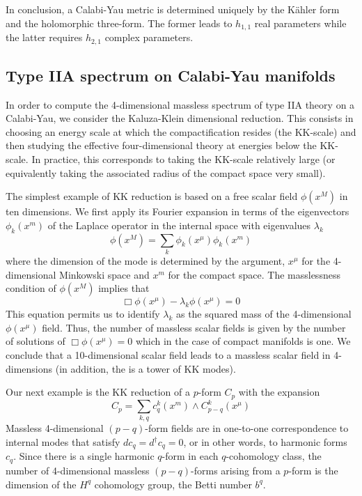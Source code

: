 In conclusion, a Calabi-Yau metric is determined uniquely by the Kähler form and the holomorphic three-form.
The former leads to $h_{1,1}$ real parameters while the latter requires $h_{2,1}$ complex parameters.


\subsection{Type IIA spectrum on Calabi-Yau manifolds}
In order to compute the 4-dimensional massless spectrum of type IIA theory on a Calabi-Yau, we consider the 
Kaluza-Klein dimensional reduction.
This consists in choosing an energy scale at which the compactification resides (the KK-scale)
and then studying the effective four-dimensional theory at energies below the KK-scale.
In practice, this corresponds to taking the KK-scale relatively large (or equivalently taking the associated radius of the compact space very small). 

The simplest example of KK reduction is based on a free scalar field $\phi(x^M)$ in ten dimensions.
We first apply its Fourier expansion in terms of the eigenvectors $\phi_k(x^m)$ of the Laplace operator in the internal space  with eigenvalues $\lambda_k$
\begin{equation}
  \phi(x^M)= \sum_k \phi_k(x^\mu)\phi_k(x^m)
\end{equation}
where the dimension of the mode is determined by the argument, $x^\mu$ for the 4-dimensional Minkowski space and $x^m$ for the compact space.
The masslessness condition of $\phi(x^M)$ implies that
\begin{equation}
 \Box \phi(x^\mu) - \lambda_k \phi(x^\mu)=0 
\end{equation}
This equation permits us to identify $\lambda_k$  as the squared mass of the 4-dimensional $\phi(x^\mu)$ field.
Thus, the number of massless scalar fields is given by the number of solutions of $\Box \phi(x^\mu)=0$ which in the
case of compact manifolds is one.
We conclude that a 10-dimensional scalar field leads to a massless scalar field in 4-dimensions (in addition, the is a tower of KK modes).

Our next example is the KK reduction of a $p$-form $C_p$ with the expansion 
\begin{equation}
  C_p=\sum_{k,q} c_q^k(x^m)\wedge C^k_{p-q}(x^\mu)
\end{equation}
Massless 4-dimensional $(p-q)$-form fields are in one-to-one correspondence to internal modes that satisfy $dc_q=d^\dagger c_q=0$, 
or in other words, to harmonic forms $c_q$.
Since there is a single harmonic $q$-form in each $q$-cohomology class, 
the number of 4-dimensional massless $(p-q)$-forms arising from a $p$-form is the dimension of the $H^q$ cohomology group, the 
Betti number $b^q$.


